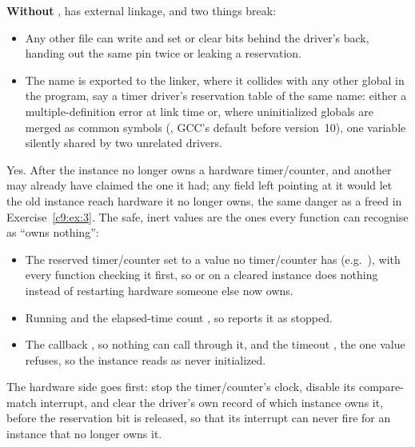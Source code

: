 \textbf{Without },  has external linkage, and two things break:
\begin{itemize}
  \item Any other file can write  and set or clear bits behind the
    driver's back, handing out the same pin twice or leaking a reservation.
  \item The name is exported to the linker, where it collides with any other global
     in the program, say a timer driver's reservation table of the same name: either
    a multiple-definition error at link time or, where uninitialized globals are merged as common
    symbols (, GCC's default before version~10), one variable silently shared by two
    unrelated drivers.
\end{itemize}

Yes. After  the instance no longer owns a hardware timer/counter, and another
 may already have claimed the one it had; any field left pointing at it would let the
old instance reach hardware it no longer owns, the same danger as a freed  in
Exercise~\ref{c9:ex:3}. The safe, inert values are the ones every function can recognise as ``owns
nothing'':
\begin{itemize}
  \item The reserved timer/counter set to a value no timer/counter has (e.g.\ ), with
    every function checking it first, so  or  on a cleared
    instance does nothing instead of restarting hardware someone else now owns.
  \item Running  and the elapsed-time count , so  reports
    it as stopped.
  \item The callback , so nothing can call through it, and the timeout , the one
    value  refuses, so the instance reads as never initialized.
\end{itemize}
The hardware side goes first: stop the timer/counter's clock, disable its compare-match interrupt,
and clear the driver's own record of which instance owns it, before the reservation bit is
released, so that its interrupt can never fire for an instance that no longer owns it.
